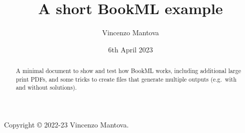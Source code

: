 \documentclass[oneside,11pt]{amsart}
\title{A short BookML example}
\author{Vincenzo Mantova}
\date{6th April 2023}
\begin{document}
\begin{abstract}
  A minimal document to show and test how BookML works, including additional large print PDFs, and some tricks to create files that generate multiple outputs (e.g.\ with and without solutions).
\end{abstract}

\maketitle

\begin{lxFooter}
  Copyright \copyright{} 2022-23 Vincenzo Mantova.
\end{lxFooter}


\end{document}
